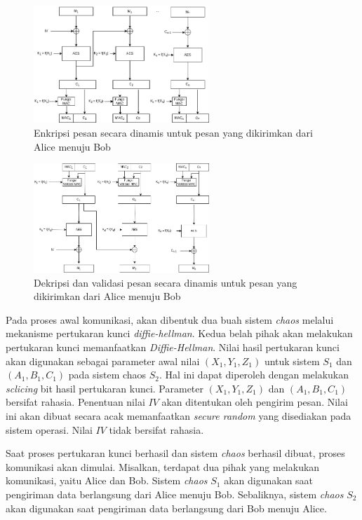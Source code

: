 \begin{figure}[!h]
  \centering
  \includegraphics[width=250px]{chapters/res/chapter-3/img/encrypt.png}
  \caption{Enkripsi pesan secara dinamis untuk pesan yang dikirimkan dari Alice menuju Bob} \label{fig:solution.encrypt}
\end{figure}

\begin{figure}[!h]
  \centering
  \includegraphics[width=250px]{chapters/res/chapter-3/img/decrypt.png}
  \caption{Dekripsi dan validasi pesan secara dinamis untuk pesan yang dikirimkan dari Alice menuju Bob} \label{fig:solution.decrypt}
\end{figure}

Pada proses awal komunikasi, akan dibentuk dua buah sistem \emph{chaos} melalui mekanisme pertukaran kunci \emph{diffie-hellman}. Kedua belah pihak akan melakukan pertukaran kunci memanfaatkan \emph{Diffie-Hellman}. Nilai hasil pertukaran kunci akan digunakan sebagai parameter awal nilai $(X_1, Y_1, Z_1)$ untuk sistem $S_1$ dan $(A_1, B_1, C_1)$ pada sistem chaos $S_2$. Hal ini dapat diperoleh dengan melakukan \emph{sclicing} bit hasil pertukaran kunci. Parameter $(X_1, Y_1, Z_1)$ dan $(A_1, B_1, C_1)$ bersifat rahasia. Penentuan nilai $IV$ akan ditentukan oleh pengirim pesan. Nilai ini akan dibuat secara acak memanfaatkan \emph{secure random} yang disediakan pada sistem operasi. Nilai $IV$  tidak bersifat rahasia.

Saat proses pertukaran kunci berhasil dan sistem \emph{chaos} berhasil dibuat, proses komunikasi akan dimulai. Misalkan, terdapat dua pihak yang melakukan komunikasi, yaitu Alice dan Bob. Sistem \emph{chaos} $S_1$ akan digunakan saat pengiriman data berlangsung dari Alice menuju Bob.  Sebaliknya, sistem \emph{chaos} $S_2$ akan digunakan saat pengiriman data berlangsung dari Bob menuju Alice.

